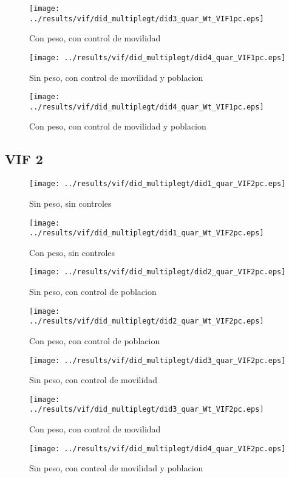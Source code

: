 \documentclass[11pt,letterpaper]{article}
\begin{document}
\begin{figure}[H]
\caption{Con peso, con control de movilidad}
\centering
\texttt{[image: ../results/vif/did\_multiplegt/did3\_quar\_Wt\_VIF1pc.eps]}
\end{figure}
\begin{figure}[H]
\caption{Sin peso, con control de movilidad y poblacion}
\centering
\texttt{[image: ../results/vif/did\_multiplegt/did4\_quar\_VIF1pc.eps]}
\end{figure}

\begin{figure}[H]
\caption{Con peso, con control de movilidad y poblacion}
\centering
\texttt{[image: ../results/vif/did\_multiplegt/did4\_quar\_Wt\_VIF1pc.eps]}
\end{figure}
	
	\subsection{VIF 2}
\begin{figure}[H]
\caption{Sin peso, sin controles}
\centering
\texttt{[image: ../results/vif/did\_multiplegt/did1\_quar\_VIF2pc.eps]}
\end{figure}

\begin{figure}[H]
\caption{Con peso, sin controles}
\centering
\texttt{[image: ../results/vif/did\_multiplegt/did1\_quar\_Wt\_VIF2pc.eps]}
\end{figure}
\begin{figure}[H]
\caption{Sin peso, con control de poblacion}
\centering
\texttt{[image: ../results/vif/did\_multiplegt/did2\_quar\_VIF2pc.eps]}
\end{figure}

\begin{figure}[H]
\caption{Con peso, con control de poblacion}
\centering
\texttt{[image: ../results/vif/did\_multiplegt/did2\_quar\_Wt\_VIF2pc.eps]}
\end{figure}
\begin{figure}[H]
\caption{Sin peso, con control de movilidad}
\centering
\texttt{[image: ../results/vif/did\_multiplegt/did3\_quar\_VIF2pc.eps]}
\end{figure}

\begin{figure}[H]
\caption{Con peso, con control de movilidad}
\centering
\texttt{[image: ../results/vif/did\_multiplegt/did3\_quar\_Wt\_VIF2pc.eps]}
\end{figure}
\begin{figure}[H]
\caption{Sin peso, con control de movilidad y poblacion}
\centering
\texttt{[image: ../results/vif/did\_multiplegt/did4\_quar\_VIF2pc.eps]}
\end{figure}
\end{document}
